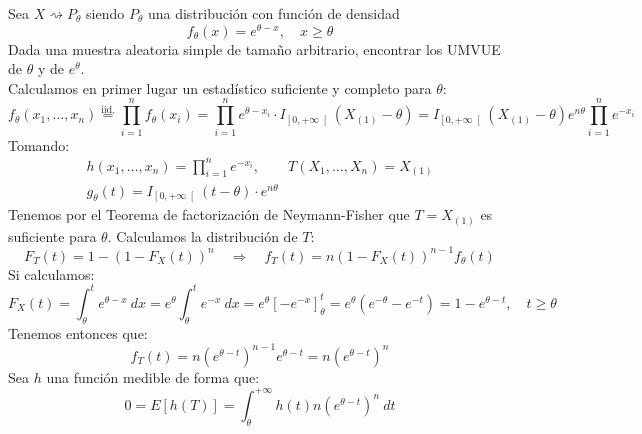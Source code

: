 \begin{ejercicio}
    Sea $X\rightsquigarrow P_\theta$ siendo $P_\theta$ una distribución con función de densidad
    \begin{equation*}
        f_\theta(x) = e^{\theta-x}, \quad x\geq \theta
    \end{equation*}
    Dada una muestra aleatoria simple de tamaño arbitrario, encontrar los UMVUE de $\theta$ y de $e^{\theta}$.\\

    \noindent
    Calculamos en primer lugar un estadístico suficiente y completo para $\theta$:
    \begin{equation*}
        f_\theta(x_1, \ldots, x_n) \stackrel{\text{iid.}}{=} \prod_{i=1}^{n}f_\theta(x_i) = \prod_{i=1}^{n} e^{\theta-x_i} \cdot I_{\left[0,+\infty\right[}(X_{(1)}-\theta)=I_{\left[0,+\infty\right[}(X_{(1)}-\theta) e^{n\theta}\prod_{i=1}^{n} e^{-x_i}
    \end{equation*}
    Tomando:
    \begin{gather*}
        h(x_1, \ldots, x_n) = \prod_{i=1}^{n}e^{-x_i}, \qquad T(X_1, \ldots, X_n) = X_{(1)} \\
        g_\theta(t) = I_{\left[0,+\infty\right[}(t-\theta) \cdot e^{n\theta}
    \end{gather*}
    Tenemos por el Teorema de factorización de Neymann-Fisher que $T=X_{(1)}$ es suficiente para $\theta$. Calculamos la distribución de $T$:
    \begin{equation*}
        F_T(t) = 1-{(1-F_X(t))}^{n} \quad \Longrightarrow \quad f_T(t) = n{(1-F_X(t))}^{n-1}f_\theta(t)
    \end{equation*}
    Si calculamos:
    \begin{equation*}
        F_X(t) = \int_{\theta}^{t} e^{\theta-x}~dx  = e^{\theta}\int_{\theta}^{t} e^{-x}~dx  = e^{\theta}[-e^{-x}]_\theta^t = e^{\theta}\left(e^{-\theta} - e^{-t}\right) = 1- e^{\theta-t}, \quad t\geq \theta
    \end{equation*}
    Tenemos entonces que:
    \begin{equation*}
        f_T(t) = n{\left(e^{\theta-t}\right)}^{n-1} e^{\theta-t} = n{\left(e^{\theta-t}\right)}^{n}
    \end{equation*}
    Sea $h$ una función medible de forma que:
    \begin{equation*}
        0 = E[h(T)] = \int_{\theta}^{+\infty} h(t)n{\left(e^{\theta-t}\right)}^{n}~dt 
    \end{equation*} %
\end{ejercicio}


